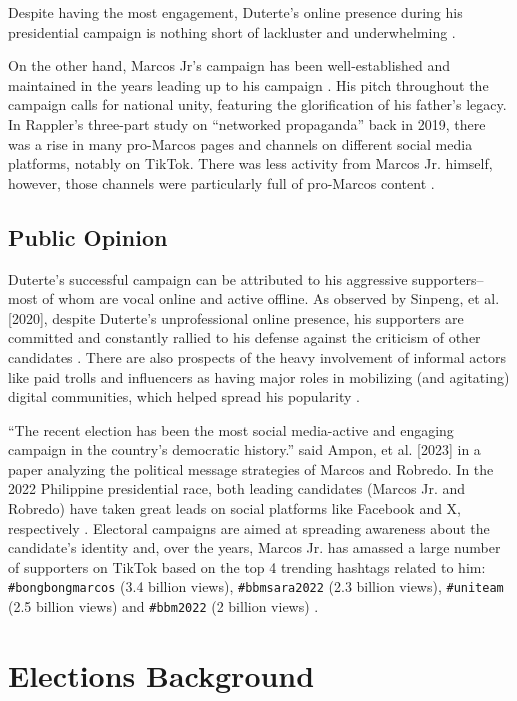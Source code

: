 Despite having the most engagement, Duterte’s online presence during his presidential campaign is nothing short of lackluster and underwhelming \cite{RRL_Sinpeng-2020}.

On the other hand, Marcos Jr’s campaign has been well-established and maintained in the years leading up to his campaign \cite{RRL_Mendoza-2022}. His pitch throughout the campaign calls for national unity, featuring the glorification of his father’s legacy. In Rappler’s three-part study on “networked propaganda” back in 2019, there was a rise in many pro-Marcos pages and channels on different social media platforms, notably on TikTok. There was less activity from Marcos Jr. himself, however, those channels were particularly full of pro-Marcos content \cite{RRL_Mendoza-2022}.

\subsection{Public Opinion}
Duterte’s successful campaign can be attributed to his aggressive supporters– most of whom are vocal online and active offline. As observed by Sinpeng, et al. [2020], despite Duterte’s unprofessional online presence, his supporters are committed and constantly rallied to his defense against the criticism of other candidates \cite{RRL_Sinpeng-2020}. There are also prospects of the heavy involvement of informal actors like paid trolls and influencers as having major roles in mobilizing (and agitating) digital communities, which helped spread his popularity \cite{RRL_Sinpeng-2020}.

“The recent election has been the most social media-active and engaging campaign in the country’s democratic history.” said Ampon, et al. [2023] in a paper analyzing the political message strategies of Marcos and Robredo.  In the 2022 Philippine presidential race, both leading candidates (Marcos Jr. and Robredo) have taken great leads on social platforms like Facebook and X, respectively \cite{RRL_Ampon-2023}. Electoral campaigns are aimed at spreading awareness about the candidate’s identity and, over the years, Marcos Jr. has amassed a large number of supporters on TikTok based on the top 4 trending hashtags related to him: \texttt{\#bongbongmarcos} (3.4 billion views), \texttt{\#bbmsara2022} (2.3 billion views), \texttt{\#uniteam} (2.5 billion views) and \texttt{\#bbm2022} (2 billion views) \cite{RRL_Mendoza-2022}.

\section{Elections Background}
